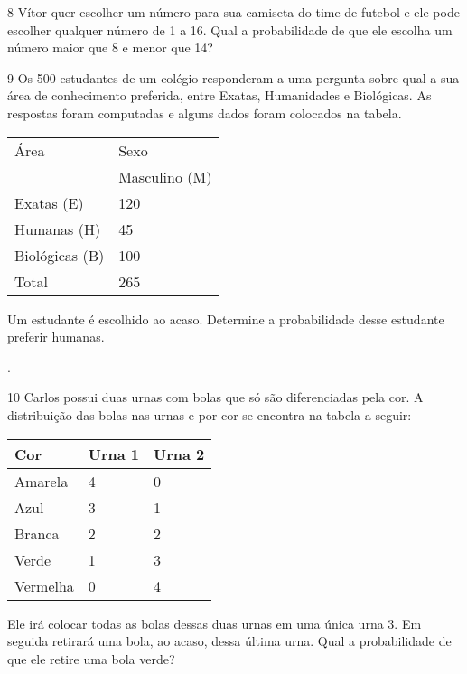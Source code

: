\num{8} Vítor quer escolher um número para sua camiseta do time de futebol
e ele pode escolher qualquer número de 1 a 16. Qual a probabilidade de
que ele escolha um número maior que 8 e menor que 14?



\num{9} Os 500 estudantes de um colégio responderam a uma pergunta sobre
qual a sua área de conhecimento preferida, entre Exatas, Humanidades e
Biológicas. As respostas foram computadas e alguns dados foram colocados
na tabela.

\begin{longtable}[]{@{}ll@{}}
\toprule
Área & Sexo\tabularnewline
& Masculino (M)\tabularnewline
Exatas (E) & 120\tabularnewline
Humanas (H) & 45\tabularnewline
Biológicas (B) & 100\tabularnewline
Total & 265\tabularnewline
\bottomrule
\end{longtable}

Um estudante é escolhido ao acaso. Determine a probabilidade desse
estudante preferir humanas.

.


\num{10} Carlos possui duas urnas com bolas que só são diferenciadas pela
cor. A distribuição das bolas nas urnas e por cor se encontra na tabela
a seguir:

\begin{longtable}[]{@{}lll@{}}
\toprule
Cor & Urna 1 & Urna 2\tabularnewline
\midrule
\endhead
Amarela & 4 & 0\tabularnewline
Azul & 3 & 1\tabularnewline
Branca & 2 & 2\tabularnewline
Verde & 1 & 3\tabularnewline
Vermelha & 0 & 4\tabularnewline
\bottomrule
\end{longtable}

Ele irá colocar todas as bolas dessas duas urnas em uma única urna 3. Em
seguida retirará uma bola, ao acaso, dessa última urna. Qual a
probabilidade de que ele retire uma bola verde?



